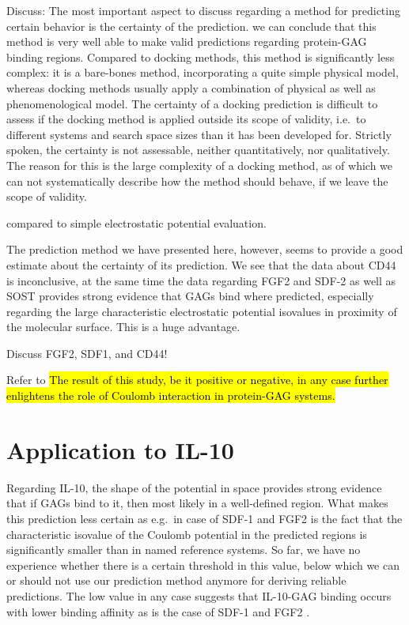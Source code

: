 Discuss: The most important aspect to discuss regarding a method for predicting
certain behavior is the certainty of the prediction. we can conclude that this
method is very well able to make valid predictions regarding protein-GAG binding
regions. Compared to docking methods, this method is significantly less complex:
it is a bare-bones method, incorporating a quite simple physical model, whereas
docking methods usually apply a combination of physical as well as
phenomenological model. The certainty of a docking prediction is difficult to
assess if the docking method is applied outside its scope of validity, i.e.\ to
different systems and search space sizes than it has been developed for.
Strictly spoken, the certainty is not assessable, neither quantitatively, nor
qualitatively. The reason for this is the large complexity of a docking method,
as of which we can not systematically describe how the method should behave, if
we leave the scope of validity.

compared to simple electrostatic potential evaluation.

The prediction method we have presented here, however, seems to provide a good
estimate about the certainty of its prediction. We see that the data about CD44
is inconclusive, at the same time the data regarding FGF2 and SDF-2 as well as
SOST provides strong evidence that GAGs bind where predicted, especially regarding
the large characteristic electrostatic potential isovalues in proximity of the
molecular surface. This is a huge advantage.



Discuss FGF2, SDF1, and CD44!

Refer to \hl{The result of this study, be it positive or negative, in any case
further enlightens the role of Coulomb interaction in protein-GAG systems.}

\section{Application to IL-10}

Regarding IL-10, the shape of the potential in space provides strong evidence
that if GAGs bind to it, then most likely in a well-defined region. What makes
this prediction less certain as e.g.\ in case of SDF-1 and FGF2 is the fact that
the characteristic isovalue of the Coulomb potential in the predicted regions is
significantly smaller than in named reference systems. So far, we have no
experience whether there is a certain threshold in this value, below which we
can or should not use our prediction method anymore for deriving reliable
predictions. The low value in any case suggests that IL-10-GAG binding occurs
with lower binding affinity as is the case of  SDF-1 and FGF2 .

